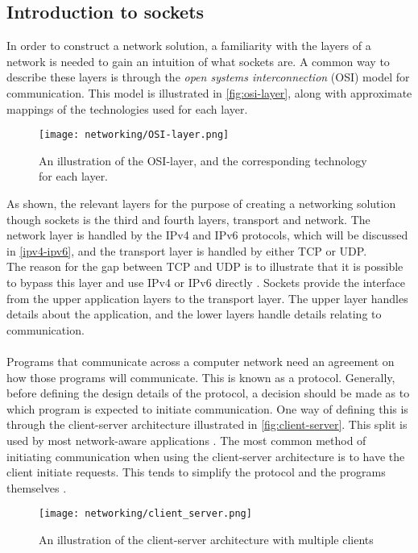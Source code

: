 \subsection{Introduction to sockets}
In order to construct a network solution, a familiarity with the layers of a network is needed to gain an intuition of what sockets are.
A common way to describe these layers is through the \textit{open systems interconnection} (OSI) model for communication.
This model is illustrated in \autoref{fig:osi-layer}, along with approximate mappings of the technologies used for each layer.
\begin{figure}[H]
    \centering
    \texttt{[image: networking/OSI-layer.png]}
    \caption{An illustration of the OSI-layer, and the corresponding technology for each layer.}
    \label{fig:osi-layer}
\end{figure}
\noindent
As shown, the relevant layers for the purpose of creating a networking solution though sockets is the third and fourth layers, transport and network.
The network layer is handled by the IPv4 and IPv6 protocols, which will be discussed in \autoref{ipv4-ipv6}, and the transport layer is handled by either TCP or UDP.\\
The reason for the gap between TCP and UDP is to illustrate that it is possible to bypass this layer and use IPv4 or IPv6 directly \cite{socketnetworking}.
Sockets provide the interface from the upper application layers to the transport layer.
The upper layer handles details about the application, and the lower layers handle details relating to communication.
\\\\
Programs that communicate across a computer network need an agreement on how those programs will communicate.
This is known as a protocol.
Generally, before defining the design details of the protocol, a decision should be made as to which program is expected to initiate communication.
One way of defining this is through the client-server architecture illustrated in \autoref{fig:client-server}.
This split is used by most network-aware applications \cite{socketnetworking}.
The most common method of initiating communication when using the client-server architecture is to have the client initiate requests.
This tends to simplify the protocol and the programs themselves \cite{socketnetworking}.

\begin{figure}[H]
    \centering
    \texttt{[image: networking/client\_server.png]}
    \caption{An illustration of the client-server architecture with multiple clients}
    \label{fig:client-server}
\end{figure}


